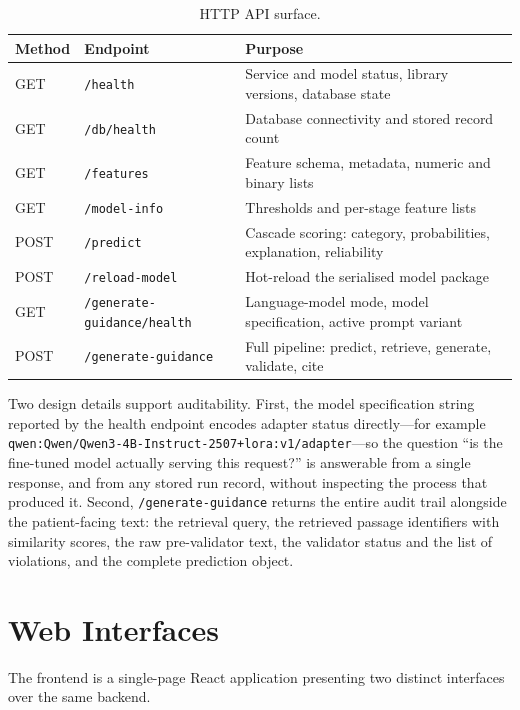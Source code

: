 \begin{table}[H]
\centering
\caption{HTTP API surface.}
\label{tab:api}
\small
\begin{tabularx}{\textwidth}{@{}l L{1.85in} X@{}}
\toprule
\textbf{Method} & \textbf{Endpoint} & \textbf{Purpose} \\
\midrule
GET & \texttt{/health} & Service and model status, library versions, database state \\
GET & \texttt{/db/health} & Database connectivity and stored record count \\
GET & \texttt{/features} & Feature schema, metadata, numeric and binary lists \\
GET & \texttt{/model-info} & Thresholds and per-stage feature lists \\
POST & \texttt{/predict} & Cascade scoring: category, probabilities,
explanation, reliability \\
POST & \texttt{/reload-model} & Hot-reload the serialised model package \\
GET & \texttt{/generate-guidance/health} & Language-model mode, model
specification, active prompt variant \\
POST & \texttt{/generate-guidance} & Full pipeline: predict, retrieve,
generate, validate, cite \\
\bottomrule
\end{tabularx}
\end{table}

Two design details support auditability. First, the model specification string
reported by the health endpoint encodes adapter status directly---for example
\texttt{qwen:Qwen/Qwen3-4B-Instruct-2507+lora:v1/adapter}---so the question
``is the fine-tuned model actually serving this request?'' is answerable from a
single response, and from any stored run record, without inspecting the process
that produced it. Second, \texttt{/generate-guidance} returns the entire audit
trail alongside the patient-facing text: the retrieval query, the retrieved
passage identifiers with similarity scores, the raw pre-validator text, the
validator status and the list of violations, and the complete prediction object.

\section{Web Interfaces}
\label{sec:frontend}

The frontend is a single-page React application presenting two distinct
interfaces over the same backend.

